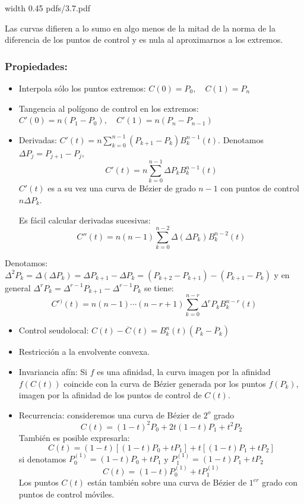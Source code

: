 \documentclass[twoside]{report}
\newcommand{\colocapdf}[2]{\quad\pdfimage width #2 {pdfs/#1.pdf}}
\begin{document}
\vspace{0.3cm}

\begin{center}
\colocapdf{3.7}{0.45\textwidth}
\end{center}

Las curvas difieren a lo sumo en algo menos de la mitad de la norma de la diferencia de los puntos de control y es nula al aproximarnos a los extremos.

\subsubsection{Propiedades:}

\begin{itemize}
\item Interpola sólo los puntos extremos: $C(0)=P_0,\quad C(1)=P_n$
\item Tangencia al polígono de control en los extremos: $C'(0)=n(P_1-P_0),\quad C'(1)=n(P_n-P_{n-1})$
\item Derivadas: $C'(t)=n\sum_{k=0}^{n-1}(P_{k+1}-P_k)B_k^{n-1}(t).$ Denotamos $\Delta P_j=P_{j+1}-P_j,$
$$C'(t)=n\sum_{k=0}^{n-1}\Delta P_kB_k^{n-1}(t)$$ $C'(t)$ es a su vez una curva de Bézier de grado $n-1$ con puntos de control $n\Delta P_k.$

Es fácil calcular derivadas sucesivas:
$$C''(t)=n(n-1)\sum_{k=0}^{n-2} \Delta(\Delta P_k)B_k^{n-2}(t)$$
\end{itemize}

Denotamos: $\Delta^2 P_k=\Delta(\Delta P_k)=\Delta P_{k+1}-\Delta P_k=(P_{k+2}-P_{k+1})-(P_{k+1}-P_k)$ y en general $\Delta^r P_k=\Delta^{r-1} P_{k+1}-\Delta^{r-1} P_k$ se tiene:
$$C^{r)}(t)=n(n-1)\cdots(n-r+1)\sum_{k=0}^{n-r} \Delta^r P_k B_k^{n-r}(t)$$

\begin{itemize}
\item Control seudolocal: $C(t)-\overline{C}(t)=B_k^n(t) (P_k-\overline{P}_k)$
\item  Restricción a la envolvente convexa. %
\item Invariancia afín: Si $f$ es una afinidad, la curva imagen por la afinidad $f(C(t))$ coincide con la curva de Bézier generada por los puntos $f(P_k)$, imagen por la afinidad de los puntos de control de $C(t)$.
\item Recurrencia:  consideremos una curva de Bézier de $2^{o}$ grado
$$C(t)=(1-t)^2 P_0+2t(1-t) P_1+t^2P_2$$
También es posible expresarla:
$$C(t)=(1-t)[(1-t)P_0+tP_1]+t[(1-t)P_1+tP_2]$$
si denotamos $P_0^{(1)}=(1-t)P_0+tP_1$ \;y\; $P_1^{(1)}=(1-t)P_1+tP_2$
$$C(t)=(1-t)P_0^{(1)}+tP_1^{(1)}$$
Los puntos $C(t)$ están también sobre una curva de Bézier de $1^{er}$ grado con puntos de control móviles.
\end{itemize}
\end{document}
